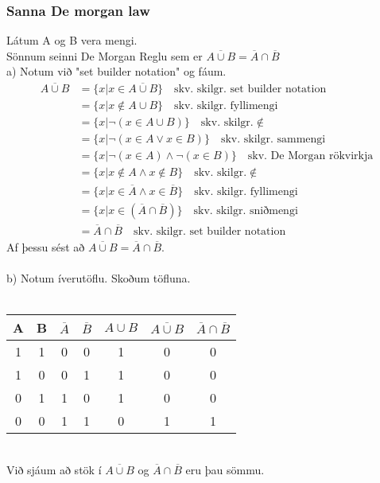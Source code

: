 \subsubsection{Sanna De morgan law}
Látum A og B vera mengi.\\
Sönnum seinni De Morgan Reglu sem er $\overline{A \cup B} = \overline{A} \cap \overline{B}$\\
a) Notum við "set builder notation" og fáum.
\begin{align*}
    \overline{A \cup B} &= \{x|x \in \overline{A \cup B}\} \quad \text{skv. skilgr. set builder notation} \\
    &= \{x|x \notin A \cup B\} \quad \text{skv. skilgr. fyllimengi} \\
    &= \{x|\lnot (x \in A \cup B)\} \quad \text{skv. skilgr.} \notin \\
    &= \{x|\lnot (x \in A \vee x \in B)\} \quad \text{skv. skilgr. sammengi}\\
    &= \{x|\lnot (x \in A) \wedge \lnot(x \in B)\} \quad \text{skv. De Morgan rökvirkja} \\
    &= \{x| x \notin A \wedge x \notin B\} \quad \text{skv. skilgr.} \notin \\
    &= \{x|x \in \overline{A} \wedge x \in \overline{B}\} \quad \text{skv. skilgr. fyllimengi}\\
    &= \{x|x \in (\overline{A} \cap \overline{B})\} \quad \text{skv. skilgr. sniðmengi}\\
    &= \overline{A} \cap \overline{B} \quad \text{skv. skilgr. set builder notation}
\end{align*}
Af þessu sést að $\overline{A \cup B} = \overline{A} \cap \overline{B}$.\\
\\
b) Notum íverutöflu. Skoðum töfluna.\\ \\
\begin{tabular}{ c|c|c|c|c|c|c }
    A & B & $\overline{A}$ & $\overline{B}$ & $A \cup B$ & $\overline{A \cup B}$ & $\overline{A} \cap \overline{B}$
    \\ \hline
    1 & 1 & 0 & 0 & 1 & 0 & 0 \\
    1 & 0 & 0 & 1 & 1 & 0 & 0 \\
    0 & 1 & 1 & 0 & 1 & 0 & 0 \\
    0 & 0 & 1 & 1 & 0 & 1 & 1
\end{tabular} \vspace*{1em}
\\ 
Við sjáum að stök í $\overline{A \cup B}$ og $\overline{A} \cap \overline{B}$ eru þau sömmu. \\
\newpage

